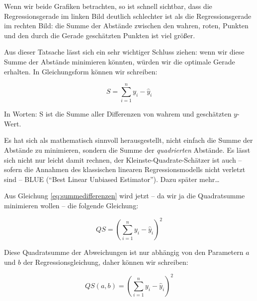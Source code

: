 \documentclass[ngerman, 12pt]{scrartcl}
\def\sm{\sum\limits_{i=1}^{n}}
\begin{document}
\label{fig:geraden2}

Wenn wir beide Grafiken betrachten, so ist schnell sichtbar, dass die Regressionsgerade im linken Bild deutlich schlechter ist als die Regressionsgerade im rechten Bild: die Summe der Abstände zwischen den wahren, roten, Punkten und den durch die Gerade geschätzten Punkten ist viel größer.

Aus dieser Tatsache lässt sich ein sehr wichtiger Schluss ziehen: wenn wir diese Summe der Abstände minimieren könnten, würden wir die optimale Gerade erhalten. In Gleichungsform können wir schreiben:

\begin{equation}
S = \sm y_i - \hat{y}_i\label{eq:summedifferenzen}
\end{equation}

In Worten: S ist die Summe aller Differenzen von wahrem und geschätzten $y$-Wert.

Es hat sich als mathematisch sinnvoll herausgestellt, nicht einfach die Summe der Abstände zu minimieren, sondern die Summe der \textit{quadrierten} Abstände. Es lässt sich nicht nur leicht damit rechnen, der Kleinste-Quadrate-Schätzer ist auch -- sofern die  Annahmen des klassischen linearen Regressionsmodells nicht verletzt sind -- BLUE (\enquote{Best Linear Unbiased Estimator}). Dazu später mehr\ldots

Aus Gleichung \ref{eq:summedifferenzen} wird jetzt -- da wir ja die Quadratsumme minimieren wollen -- die folgende Gleichung:

\begin{equation}
QS = \left(\sm y_i - \hat{y}_i\right)^2\label{eq:qabstaende}
\end{equation}

Diese Quadratsumme der Abweichungen ist nur abhängig von den Parametern \(a\) und \(b\) der Regressionsgleichung, daher können wir schreiben:

\begin{equation}
QS(a,b) = \left(\sm y_i - \hat{y}_i\right)^2
\end{equation}%


\end{document}
